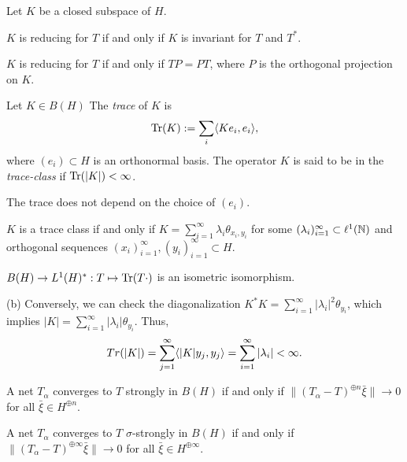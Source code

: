 \documentclass{../../large}
\begin{document}
\begin{prb}
Let $K$ be a closed subspace of $H$.
\begin{parts}
\item $K$ is reducing for $T$ if and only if $K$ is invariant for $T$ and $T^*$.
\item $K$ is reducing for $T$ if and only if $TP=PT$, where $P$ is the orthogonal projection on $K$.
\end{parts}
\end{prb}



\begin{prb}
Let $K\in B(H)$
The \emph{trace} of $K$ is
\[\operatorname{Tr}(K):=\sum_i\langle Ke_i,e_i\rangle,\]
where $(e_i)\subset H$ is an orthonormal basis.
The operator $K$ is said to be in the \emph{trace-class} if $\operatorname{Tr}(|K|)<\infty$.
\begin{parts}
\item
The trace does not depend on the choice of $(e_i)$.
\item
$K$ is a trace class if and only if $K=\sum_{i=1}^\infty\lambda_i\theta_{x_i,y_i}$ for some $(\lambda_i)_{i=1}^\infty\subset\ell^1(\mathbb{N})$ and orthogonal sequences $(x_i)_{i=1}^\infty,(y_i)_{i=1}^\infty\subset H$.
\item
$B(H)\to L^1(H)^*:T\mapsto\operatorname{Tr}(T\cdot)$ is an isometric isomorphism.
\end{parts}
\end{prb}
\begin{pf}
(b)
Conversely, we can check the diagonalization $K^*K=\sum_{i=1}^\infty|\lambda_i|^2\theta_{y_i}$, which implies $|K|=\sum_{i=1}^\infty|\lambda_i|\theta_{y_i}$.
Thus,
\[Tr(|K|)=\sum_{j=1}^\infty\langle|K|y_j,y_j\rangle=\sum_{i=1}^\infty|\lambda_i|<\infty.\]

\end{pf}




\begin{prb}
\begin{parts}
\item
A net $T_\alpha$ converges to $T$ strongly in $B(H)$ if and only if $\|(T_\alpha-T)^{\oplus n}\bar\xi\|\to0$ for all $\bar\xi\in H^{\oplus n}$.
\item
A net $T_\alpha$ converges to $T$ $\sigma$-strongly in $B(H)$ if and only if $\|(T_\alpha-T)^{\oplus\infty}\bar\xi\|\to0$ for all $\bar\xi\in H^{\oplus\infty}$.
\end{parts}
\end{prb}
\end{document}
